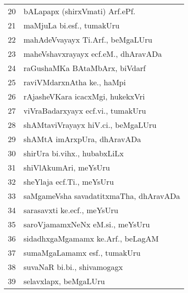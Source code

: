 {\begin{longtable}{rl}
20 & bALapapx (shirxVmati) Arf.ePf.\\
21 & maMjuLa bi.esf., tumakUru\\
22 & mahAdeVvayayx Ti.Arf., beMgaLUru\\
23 & maheVshavxrayayx ecf.eM., dhAravADa\\
24 & raGushaMKa BAtaMbArx, biVdarf\\
25 & raviVMdarxnAtha ke., haMpi\\
26 & rAjasheVKara icacxMgi, hukekxVri\\
27 & viVraBadarxyayx ecf.vi., tumakUru\\
28 & shAMtaviVrayayx hiV.ci., beMgaLUru\\
29 & shAMtA imArxpUra, dhAravADa\\
30 & shirUra bi.vihx., hubabxLiLx\\
31 & shiVlAkumAri, meYsUru\\
32 & sheYlaja ecf.Ti., meYsUru\\
33 & saMgameVsha savadatitxmaTha, dhAravADa\\
34 & sarasavxti ke.ecf., meYsUru\\
35 & saroVjamamxNeNx eM.si., meYsUru\\
36 & sidadhxgaMgamamx ke.Arf., beLagAM\\
37 & sumaMgaLamamx esf., tumakUru\\
38 & suvaNaR bi.bi., shivamogagx\\
39 &  selavxlapx, beMgaLUru\\
\end{longtable}}

